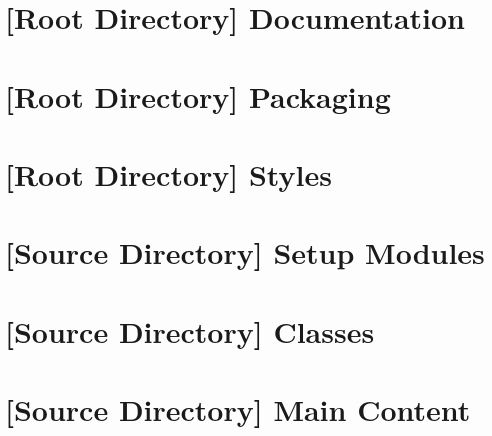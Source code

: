 \documentclass[11pt,openright,a4paper]{report}
\begin{document}
\begin{landscape}
\begin{multicols}{2}

% 

\section{[Root Directory] Documentation}

\section{[Root Directory] Packaging}

\section{[Root Directory] Styles}

\section{[Source Directory] Setup Modules}

\section{[Source Directory] Classes}

\section{[Source Directory] Main Content}


\end{multicols}
\end{landscape}
\end{document}
